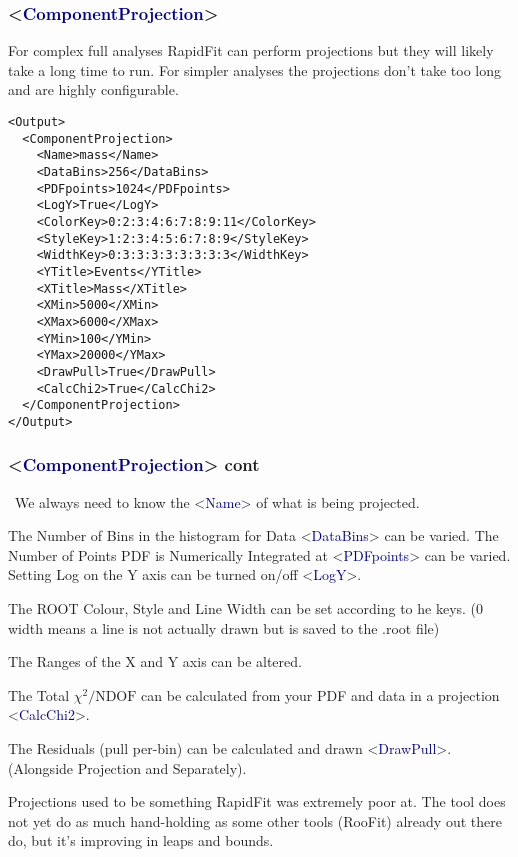 \documentclass{beamer}
\begin{document}
\begin{frame}[fragile]
\frametitle{<\textcolor{darkblue}{ComponentProjection}>}
For complex full analyses RapidFit can perform projections but they will likely take a long time to run.\newline
For simpler analyses the projections don't take too long and are highly configurable.
\tiny
\begin{lstlisting}[tabsize=8]
<Output>
  <ComponentProjection>
    <Name>mass</Name>
    <DataBins>256</DataBins>
    <PDFpoints>1024</PDFpoints>
    <LogY>True</LogY>
    <ColorKey>0:2:3:4:6:7:8:9:11</ColorKey>
    <StyleKey>1:2:3:4:5:6:7:8:9</StyleKey>
    <WidthKey>0:3:3:3:3:3:3:3:3</WidthKey>
    <YTitle>Events</YTitle>
    <XTitle>Mass</XTitle>
    <XMin>5000</XMin>
    <XMax>6000</XMax>
    <YMin>100</YMin>
    <YMax>20000</YMax>
    <DrawPull>True</DrawPull>
    <CalcChi2>True</CalcChi2>
  </ComponentProjection>
</Output>
\end{lstlisting}
\end{frame}

\begin{frame}
\frametitle{<\textcolor{darkblue}{ComponentProjection}> cont}
\scriptsize~We always need to know the <\textcolor{darkblue}{Name}> of what is being projected.\newline

The Number of Bins in the histogram for Data <\textcolor{darkblue}{DataBins}> can be varied.\newline
The Number of Points PDF is Numerically Integrated at <\textcolor{darkblue}{PDFpoints}> can be varied.\newline
Setting Log on the Y axis can be turned on/off <\textcolor{darkblue}{LogY}>.\newline

The ROOT Colour, Style and Line Width can be set according to he keys.\newline
(0 width means a line is not actually drawn but is saved to the .root file)\newline

The Ranges of the X and Y axis can be altered.\newline

The Total $\chi^2 / \text{NDOF}$ can be calculated from your PDF and data in a projection <\textcolor{darkblue}{CalcChi2}>.\newline

The Residuals (pull per-bin) can be calculated and drawn <\textcolor{darkblue}{DrawPull}>. (Alongside Projection and Separately).

Projections used to be something RapidFit was extremely poor at.
The tool does not yet do as much hand-holding as some other tools (RooFit) already out there do, but it's improving in leaps and bounds.
\end{frame}
\end{document}
